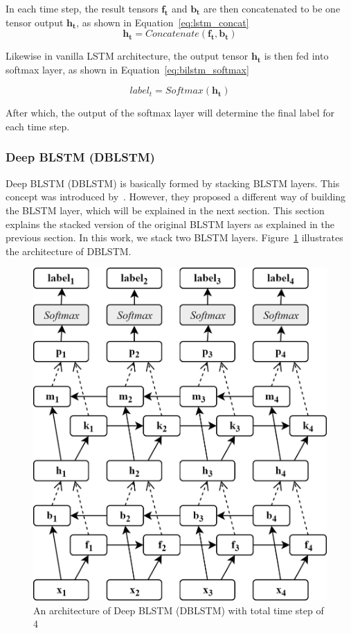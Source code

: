 In each time step, the result tensors $\mathbf{f_{t}}$ and $\mathbf{b_{t}}$ are then concatenated to be one tensor output $\mathbf{h_{t}}$, as shown in Equation~\ref{eq:lstm_concat}
\begin{equation}
\label{eq:lstm_concat}
\mathbf{h_{t}} = Concatenate(\mathbf{f_{t}}, \mathbf{b_{t}})
\end{equation}

Likewise in vanilla LSTM architecture, the output tensor $\mathbf{h_{t}}$ is then fed into softmax layer, as shown in Equation~\ref{eq:bilstm_softmax}

\begin{equation}
\label{eq:bilstm_softmax}
label_{t} = Softmax(\mathbf{h_{t}})
\end{equation}

After which, the output of the softmax layer will determine the final label for each time step.

\subsubsection{Deep BLSTM (DBLSTM)}
Deep BLSTM (DBLSTM) is basically formed by stacking BLSTM layers. This concept was introduced by~\cite{zhou2015end}. However, they proposed a different way of building the BLSTM layer, which will be explained in the next section. This section explains the stacked version of the original BLSTM layers as explained in the previous section. In this work, we stack two BLSTM layers. Figure~\ref{fig:dblstm} illustrates the architecture of DBLSTM.

\begin{figure}
	\centering
	\includegraphics[width=0.75\linewidth]{images/dblstm}
	\caption{An architecture of Deep BLSTM (DBLSTM) with total time step of 4}
	\label{fig:dblstm}
\end{figure}

